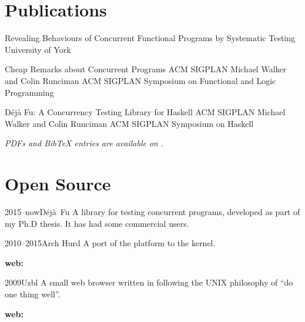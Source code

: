 \documentclass[a4paper]{barrucadu-cv}
\newcommand{\range}[2]{#1–#2}
\newcommand{\orange}[1]{\range{#1}{now}}
\begin{document}
\section{Publications}

\def\entryheadinglevel{subsection}

  {Revealing Behaviours of Concurrent Functional Programs by Systematic Testing}
  {University of York}

  {Cheap Remarks about Concurrent Programs}
  {ACM SIGPLAN}
  {Michael Walker and Colin Runciman}
  {ACM SIGPLAN Symposium on Functional and Logic Programming}

  {Déjà Fu: A Concurrency Testing Library for Haskell}
  {ACM SIGPLAN}
  {Michael Walker and Colin Runciman}
  {ACM SIGPLAN Symposium on Haskell}

\textit{PDFs and BibTeX entries are available on .}

\section{Open Source}

\begin{cventry}{\orange{2015}}{D\'{e}j\`{a}~Fu}
  A library for testing concurrent  programs,
  developed as part of my Ph.D thesis. It has had some commercial users.

  \textbf{\small{}}
\end{cventry}

\begin{cventry}{\range{2010}{2015}}{Arch Hurd}
  A port of the  platform to the
   kernel.

  \textbf{\small web: }
\end{cventry}

\begin{cventry}{2009}{Uzbl}
  A small web browser written in  following the UNIX
  philosophy of ``do one thing well''.

  \textbf{\small web: }
\end{cventry}
\end{document}
